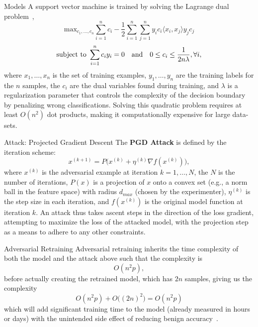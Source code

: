 \documentclass{beamer}
\begin{document}
\begin{frame}{Models}
    A support vector machine is trained by solving the Lagrange dual problem~\cite{cortes1995support},
\begin{equation}
    \textrm{max}_{c_1,\ldots,c_n}
    \sum_{i = 1}^n c_i - \frac{1}{2} \sum_{i = 1}^n \sum_{j = 1}^n y_i c_i \langle x_i, x_j \rangle y_j c_j
    \label{eq:linear_svm}
\end{equation}
$$
    \textrm{subject to } \sum_{i = 1}^n c_i y_i = 0 \textrm{\quad and\quad} 0 \leq c_i \leq \frac{1}{2n\lambda}, \forall i,
$$
where $x_1,\ldots,x_n$ is the set of training examples, $y_1,\ldots,y_n$ are the training labels for the $n$ samples, the $c_i$ are the dual variables found during training, and $\lambda$ is a regularization parameter that controls the complexity of the decision boundary by penalizing wrong classifications. Solving this quadratic problem requires at least $O(n^2)$ dot products, making it computationally expensive for large data-sets.
\end{frame}

\begin{frame}{Attack: Projected Gradient Descent}
The \textbf{PGD Attack} is defined by the iteration scheme:
$$
    x^{(k+1)} = P\big(x^{(k)} + \eta^{(k)} \nabla f(x^{(k)})\big),
$$
where $x^{(k)}$ is the adversarial example at iteration $k = 1,\ldots,N$, the $N$ is the number of iterations, $P(x)$ is a projection of $x$ onto a convex set (e.g., a norm ball in the feature space) with radius $d_{max}$ (chosen by the experimenter), $\eta^{(k)}$ is the step size in each iteration, and $f(x^{(k)})$ is the original model function at iteration $k$. An attack thus takes ascent steps in the direction of the loss gradient, attempting to maximize the loss of the attacked model, with the projection step as a means to adhere to any other constraints.
\end{frame}

\begin{frame}{Adversarial Retraining}
    Adversarial retraining inherits the time complexity of both the model and the attack above such that the complexity is
$$
    O(n^2p),
$$
before actually creating the retrained model, which has $2n$ samples, giving us the complexity
$$
    O(n^2p) + O\big((2n)^2\big) = O(n^2p)
$$
which will add significant training time to the model (already measured in hours or days) with the unintended side effect of reducing benign accuracy~\cite{stutz2019confidence}.
\end{frame}
\end{document}
